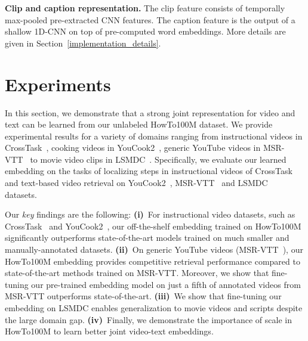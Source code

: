 \documentclass[10pt,twocolumn,letterpaper]{article}
\begin{document}
{\bf \noindent Clip and caption representation.}
The clip feature  consists of temporally max-pooled pre-extracted CNN features.
The caption feature  is the output of a shallow 1D-CNN on top of pre-computed word embeddings.
More details are given in Section~\ref{implementation_details}.
 

\section{Experiments}

In this section, we demonstrate that a strong joint representation for video and text can be learned from our unlabeled HowTo100M dataset.
We provide experimental results for a variety of domains ranging from instructional videos in CrossTask~\cite{zhukov2019crosstask},
cooking videos in YouCook2~\cite{youcook2}, generic YouTube videos in MSR-VTT~\cite{xu16msrvtt} to movie video clips in LSMDC~\cite{rohrbach17movie}.
Specifically, we evaluate our learned embedding on the tasks of localizing steps in instructional videos of CrossTask~\cite{zhukov2019crosstask}
and text-based video retrieval on YouCook2~\cite{youcook2}, MSR-VTT~\cite{xu16msrvtt} and LSMDC~\cite{rohrbach17movie} datasets.
 
Our \emph{key} findings are the following:
\textbf{(i)}~For instructional video datasets, such as CrossTask~\cite{zhukov2019crosstask} and YouCook2~\cite{youcook2},
our off-the-shelf embedding trained on HowTo100M significantly outperforms state-of-the-art models trained on much smaller and manually-annotated datasets.
\textbf{(ii)}~On generic YouTube videos (MSR-VTT~\cite{xu16msrvtt}), our HowTo100M embedding provides competitive retrieval performance compared to state-of-the-art methods trained on MSR-VTT.
Moreover, we show that fine-tuning our pre-trained embedding model on just a fifth of annotated videos from MSR-VTT outperforms state-of-the-art.
\textbf{(iii)}~We show that fine-tuning our embedding on LSMDC enables generalization to movie videos and scripts despite the large domain gap. 
\textbf{(iv)}~Finally, we demonstrate the importance of scale in HowTo100M to learn better joint video-text embeddings.

\begin{table}[t]
  \setlength{\tabcolsep}{3pt}
    \centering  
\vspace{-2mm}
 \caption{Impact of intra-video negative pairs during training. M: MSR-VTT, L: LSMDC, Y: YouCook2, C: CrossTask.}
 \vspace{-4mm}
      \label{table:sampling-experiment}
\end{table}
\end{document}

